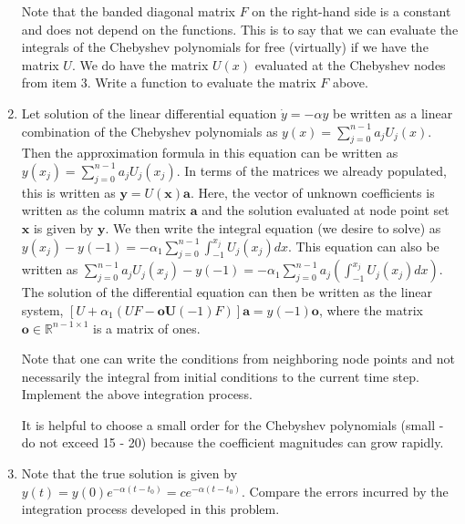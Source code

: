 \documentclass{article}
\begin{document}
\begin{enumerate}
    Note that the banded diagonal matrix $F$ on the right-hand side is a constant and does not depend on the functions. This is to say that we can evaluate the integrals of the Chebyshev polynomials for free (virtually) if we have the matrix $U$. We do have the matrix $U(x)$ evaluated at the Chebyshev nodes from item 3. Write a function to evaluate the matrix $F$ above.

    \item Let solution of the linear differential equation $\dot{y}=-\alpha y$ be written as a linear combination of the Chebyshev polynomials as $y(x)= \sum_{j=0}^{n-1} a_jU_j(x)$. Then the approximation formula in this equation can be written as $y(x_j)= \sum_{j=0}^{n-1} a_jU_j(x_j)$. In terms of the matrices we already populated, this is written as $\mathbf{y}=U(\mathbf{x})\mathbf{a}$. Here, the vector of unknown coefficients is written as the column matrix $\mathbf{a}$ and the solution evaluated at node point set $\mathbf{x}$ is given by $\mathbf{y}$. We then write the integral equation (we desire to solve) as $y(x_j) - y(-1)= -\alpha_1\sum_{j=0}^{n-1} \int_{-1}^{x_j}U_j(x_j)dx$. This equation can also be written as $\sum_{j=0}^{n-1} a_jU_j(x_j)-y(-1)= -\alpha_1\sum_{j=0}^{n-1} a_j(\int_{-1}^{x_j}U_j(x_j)dx)$. The solution of the differential equation can then be written as the linear system, $[U + \alpha_1(UF-\mathbf{o}\mathbf{U}(-1)F)]\mathbf{a}=y(-1)\mathbf{o}$, where the matrix $\mathbf{o} \in \mathbb{R}^{n-1\times 1}$ is a matrix of ones.
    \par
    Note that one can write the conditions from neighboring node points and not necessarily the integral from initial conditions to the current time step. Implement the above integration process.
    \par
    It is helpful to choose a small order for the Chebyshev polynomials (small - do not exceed 15 - 20) because the coefficient magnitudes can grow rapidly.

    \item Note that the true solution is given by $y(t)=y(0)e^{-\alpha (t-t_0)}=ce^{-\alpha (t-t_0)}$. Compare the errors incurred by the integration process developed in this problem.
\end{enumerate}
\end{document}
